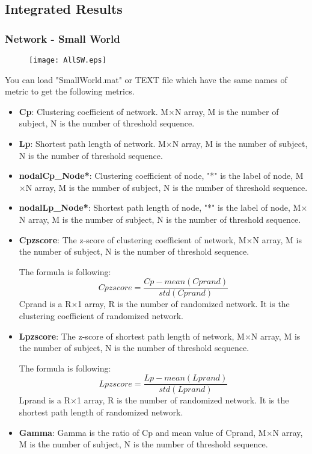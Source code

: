\documentclass[11pt]{article}
\begin{document}
		\subsection{Integrated Results}
			\subsubsection{Network - Small World}
				\begin{figure}
					\begin{center}
						\texttt{[image: AllSW.eps]}
					\end{center}
				\end{figure}
				You can load "SmallWorld.mat" or TEXT file which have the same names of metric to get the following metrics.
				\begin{itemize}
					\item \textbf{Cp}: Clustering coefficient of network.
						M$\times$N array, M is the number of subject, N is the number of threshold sequence.
					\item \textbf{Lp}: Shortest path length of network.
						M$\times$N array, M is the number of subject, N is the number of threshold sequence.
					\item \textbf{nodalCp\_Node*}: Clustering coefficient of node, "*" is the label of node,
						M$\times$N array, M is the number of subject, N is the number of threshold sequence.
					\item \textbf{nodalLp\_Node*}: Shortest path length of node, "*" is the label of node,
						M$\times$N array, M is the number of subject, N is the number of threshold sequence.
					\item \textbf{Cpzscore}: The z-score of clustering coefficient of network, 
						M$\times$N array, M is the number of subject, N is the number of threshold sequence.

						The formula is following:
						$$Cpzscore=\frac{Cp-mean(Cprand)}{std(Cprand)}$$
						Cprand is a R$\times$1 array, R is the number of randomized network. 
						It is the clustering coefficient of randomized network.
					\item \textbf{Lpzscore}: The z-score of shortest path length of network,
						M$\times$N array, M is the number of subject, N is the number of threshold sequence.

						The formula is following:
						$$Lpzscore=\frac{Lp-mean(Lprand)}{std(Lprand)}$$
						Lprand is a R$\times$1 array, R is the number of randomized network. 
						It is the shortest path length of randomized network.
					\item \textbf{Gamma}: Gamma is the ratio of Cp and mean value of Cprand,
						M$\times$N array, M is the number of subject, N is the number of threshold sequence.
						

\end{itemize}
\end{document}

